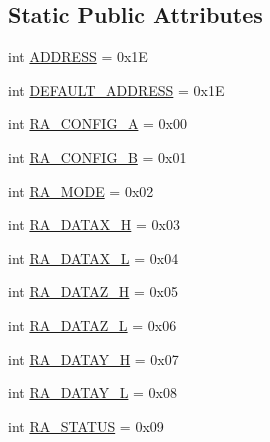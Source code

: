 \subsection*{Static Public Attributes}
\begin{DoxyCompactItemize}
\item 
int \hyperlink{classlibsensorPy_1_1concretesensor_1_1hmc5883l_1_1HMC5883L_adea7c22c02d7b7669d4b8d04f6b399f3}{A\+D\+D\+R\+E\+S\+S} = 0x1\+E
\item 
int \hyperlink{classlibsensorPy_1_1concretesensor_1_1hmc5883l_1_1HMC5883L_ad212b7b34ac1cfb18d24a1b2e1f658d7}{D\+E\+F\+A\+U\+L\+T\+\_\+\+A\+D\+D\+R\+E\+S\+S} = 0x1\+E
\item 
int \hyperlink{classlibsensorPy_1_1concretesensor_1_1hmc5883l_1_1HMC5883L_ade56e6272036cbab38e461b88de691a5}{R\+A\+\_\+\+C\+O\+N\+F\+I\+G\+\_\+\+A} = 0x00
\item 
int \hyperlink{classlibsensorPy_1_1concretesensor_1_1hmc5883l_1_1HMC5883L_acdd39f99c1fa6a6038046d6eb31d11e5}{R\+A\+\_\+\+C\+O\+N\+F\+I\+G\+\_\+\+B} = 0x01
\item 
int \hyperlink{classlibsensorPy_1_1concretesensor_1_1hmc5883l_1_1HMC5883L_acf8b89d5cfa5678cab5d0bf595c39678}{R\+A\+\_\+\+M\+O\+D\+E} = 0x02
\item 
int \hyperlink{classlibsensorPy_1_1concretesensor_1_1hmc5883l_1_1HMC5883L_a505b24e180865e6ffebfa8c6419dfe13}{R\+A\+\_\+\+D\+A\+T\+A\+X\+\_\+\+H} = 0x03
\item 
int \hyperlink{classlibsensorPy_1_1concretesensor_1_1hmc5883l_1_1HMC5883L_a94a689c18a778de33a74a5b12655f369}{R\+A\+\_\+\+D\+A\+T\+A\+X\+\_\+\+L} = 0x04
\item 
int \hyperlink{classlibsensorPy_1_1concretesensor_1_1hmc5883l_1_1HMC5883L_a7beeba14ad1f0c43dd9de11980ea9832}{R\+A\+\_\+\+D\+A\+T\+A\+Z\+\_\+\+H} = 0x05
\item 
int \hyperlink{classlibsensorPy_1_1concretesensor_1_1hmc5883l_1_1HMC5883L_a2f756dc9cf7d5dc316709201569af507}{R\+A\+\_\+\+D\+A\+T\+A\+Z\+\_\+\+L} = 0x06
\item 
int \hyperlink{classlibsensorPy_1_1concretesensor_1_1hmc5883l_1_1HMC5883L_a83b4d9a376f559539c27191f25a5959d}{R\+A\+\_\+\+D\+A\+T\+A\+Y\+\_\+\+H} = 0x07
\item 
int \hyperlink{classlibsensorPy_1_1concretesensor_1_1hmc5883l_1_1HMC5883L_ab250d5daadb7fdc199df1bb0c6820dc9}{R\+A\+\_\+\+D\+A\+T\+A\+Y\+\_\+\+L} = 0x08
\item 
int \hyperlink{classlibsensorPy_1_1concretesensor_1_1hmc5883l_1_1HMC5883L_a2a6b41ab34f5bba43c8c25d39a39e403}{R\+A\+\_\+\+S\+T\+A\+T\+U\+S} = 0x09

\end{DoxyCompactItemize}
